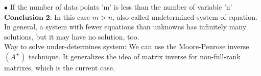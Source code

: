 \documentclass{article}%
\begin{document}
$\bullet$ If the number of data points 'm' is less than the number of variable 'n'\\

$\textbf{Conclusion-2}$: In this case $m>n$, also called undetermined system of equation. In general, a system with fewer equations than unknowns has infinitely many solutions, but it may have no solution, too.\\

Way to solve under-determines system: We can use the Moore-Penrose inverse $(A^{+})$  technique. It generalizes the idea of matrix inverse for non-full-rank matrixes, which is the current case.\\
 
\end{document}
